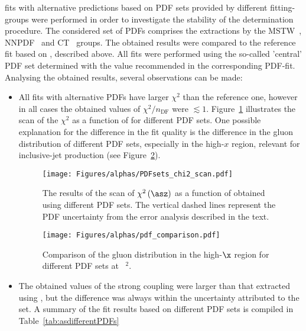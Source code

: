 \asz fits with alternative predictions based on PDF sets provided by different fitting-groups were performed in order to investigate the stability of the \asz determination procedure. The considered set of PDFs comprises the extractions by the MSTW~\cite{}, NNPDF~\cite{} and CT~\cite{} groups. The obtained results were compared to the reference fit based on , described above. All fits were performed using the so-called 'central' PDF set determined with the \asz value recommended in the corresponding PDF-fit. Analysing the obtained results, several observations can be made:
\begin{itemize}
 \item All fits with alternative PDFs have larger $\chi^2$ than the reference one, however in all cases the obtained values of $\chi^2/n_\text{DF}$ were $\lesssim 1$. Figure~\ref{fig:chi2scanpdf} illustrates the scan of the $\chi^2$ as a function of \asz for different PDF sets. One possible explanation for the difference in the fit quality is the difference in the gluon distribution of different PDF sets, especially in the high-$x$ region, relevant for inclusive-jet production (see Figure~\ref{fig:pdf_gluon_comp}).
\begin{figure}[t]
 \centering
 \texttt{[image: Figures/alphas/PDFsets\_chi2\_scan.pdf]}
 \caption{The results of the scan of $\chi^2\left(\asz\right)$ as a function of \asz obtained using different PDF sets. The vertical dashed lines represent the PDF uncertainty from the  error analysis described in the text.}
 \label{fig:chi2scanpdf}
\end{figure}
\begin{figure}[ht]
 \centering
 \texttt{[image: Figures/alphas/pdf\_comparison.pdf]}
 \caption{Comparison of the gluon distribution in the high-$\x$ region for different PDF sets at ~\GeV$^2$.}
 \label{fig:pdf_gluon_comp}
\end{figure}
 \item The obtained values of the strong coupling were larger than that extracted using , but the difference was always within the uncertainty attributed to the  set. A summary of the fit results based on different PDF sets is compiled in Table~\ref{tab:asdifferentPDFs}
\end{itemize}

